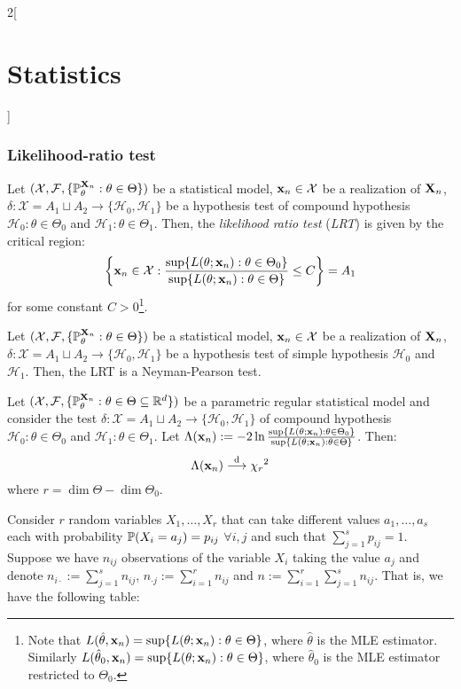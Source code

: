 \documentclass[../../../main.tex]{subfiles}
\begin{document}
\begin{multicols}{2}[\section{Statistics}]
  \subsubsection{Likelihood-ratio test}
  \begin{definition}
    Let $(\mathcal{X},\mathcal{F},\{\mathbb{P}_\theta^{\boldsymbol{\mathrm{X}}_n}:\theta\in\Theta\})$ be a statistical model, $\boldsymbol{\mathrm{x}}_n\in\mathcal{X}$ be a realization of $\boldsymbol{\mathrm{X}}_n$, $\delta:\mathcal{X}=A_1\sqcup A_2\rightarrow\{\mathcal{H}_0,\mathcal{H}_1\}$ be a hypothesis test of compound hypothesis $\mathcal{H}_0:\theta\in\Theta_0$ and $\mathcal{H}_1:\theta\in\Theta_1$.
    Then, the \emph{likelihood ratio test} (\emph{LRT}) is given by the critical region:
    $$\left\{\boldsymbol{\mathrm{x}}_n\in\mathcal{X}:\frac{\sup\{L(\theta;\boldsymbol{\mathrm{x}}_n):\theta\in\Theta_0\}}{\sup\{L(\theta;\boldsymbol{\mathrm{x}}_n):\theta\in\Theta\}}\leq C\right\}= A_1$$
    for some constant $C>0$\footnote{Note that $L(\hat\theta,\boldsymbol{\mathrm{x}}_n)=\sup\{L(\theta;\boldsymbol{\mathrm{x}}_n):\theta\in\Theta\}$, where $\hat\theta$ is the MLE estimator. Similarly $L(\hat\theta_0,\boldsymbol{\mathrm{x}}_n)=\sup\{L(\theta;\boldsymbol{\mathrm{x}}_n):\theta\in\Theta\}$, where $\hat\theta_0$ is the MLE estimator restricted to $\Theta_0$.}.
  \end{definition}
  \begin{proposition}
    Let $(\mathcal{X},\mathcal{F},\{\mathbb{P}_\theta^{\boldsymbol{\mathrm{X}}_n}:\theta\in\Theta\})$ be a statistical model, $\boldsymbol{\mathrm{x}}_n\in\mathcal{X}$ be a realization of $\boldsymbol{\mathrm{X}}_n$, $\delta:\mathcal{X}=A_1\sqcup A_2\rightarrow\{\mathcal{H}_0,\mathcal{H}_1\}$ be a hypothesis test of simple hypothesis $\mathcal{H}_0$ and $\mathcal{H}_1$. Then, the LRT is a Neyman-Pearson test.
  \end{proposition}
  \begin{theorem}
    Let $(\mathcal{X},\mathcal{F},\{\mathbb{P}_\theta^{\boldsymbol{\mathrm{X}}_n}:\theta\in\Theta\subseteq\mathbb{R}^d\})$ be a parametric regular statistical model and consider the test $\delta:\mathcal{X}=A_1\sqcup A_2\rightarrow\{\mathcal{H}_0,\mathcal{H}_1\}$ of compound hypothesis $\mathcal{H}_0:\theta\in\Theta_0$ and $\mathcal{H}_1:\theta\in\Theta_1$. Let $\Lambda(\boldsymbol{\mathrm{x}}_n):=-2\ln \frac{\sup\{L(\theta;\boldsymbol{\mathrm{x}}_n):\theta\in\Theta_0\}}{\sup\{L(\theta;\boldsymbol{\mathrm{x}}_n):\theta\in\Theta\}}$. Then:
    $$\Lambda(\boldsymbol{\mathrm{x}}_n)\overset{\text{d}}{\longrightarrow}{\chi_r}^2$$ where $r=\dim\Theta-\dim\Theta_0$.
  \end{theorem}
  \begin{definition}
    Consider $r$ \iid random variables $X_1,\ldots,X_r$ that can take different values $a_1,\ldots,a_s$ each with probability $\mathbb{P}(X_i=a_j)=p_{ij}$ $\forall i,j$ and such that $\sum_{j=1}^sp_{ij}=1$. Suppose we have $n_{ij}$ observations of the variable $X_i$ taking the value $a_j$ and denote $n_{i\cdot}:=\sum_{j=1}^sn_{ij}$, $n_{\cdot j}:=\sum_{i=1}^rn_{ij}$ and $n:=\sum_{i=1}^r\sum_{j=1}^sn_{ij}$. That is, we have the following table:

\end{definition}
\end{multicols}
\end{document}
